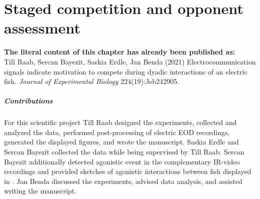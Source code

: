 
\chapter[Staged competition and opponent assessment]{Staged competition and opponent\\ assessment}
\label{Competitions}

\textbf{The literal content of this chapter has already been published as:}\\  
Till Raab, Sercan Bayezit, Saskia Erdle, Jan Benda (2021) Electrocommunication signals indicate motivation to compete during dyadic interactions of an electric fish. \textit{Journal of Experimental Biology} 224(19):Jeb242905.

\paragraph*{Contributions}
For this scientific project Till Raab designed the experiments, collected and analyzed the data, performed post-processing of electric EOD recordings, generated the displayed figures, and wrote the manuscript. 
Saskia Erdle and Sercan Bayezit collected the data while being supervised by Till Raab. Sercan Bayezit additionally  detected agonistic event in the complementary IR-video recordings and provided sketches of agonistic interactions between fish displayed in . 
Jan Benda discussed the experiments, advised data analysis, and assisted writing the manuscript. 

